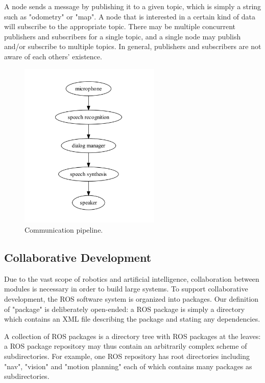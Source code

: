 A node sends a message by publishing it to a given topic, which is simply a string such as "odometry" or "map". A node that is interested in a certain kind of data will subscribe to the appropriate topic. There may be multiple concurrent publishers and subscribers for a single topic, and a single node may publish and/or subscribe to multiple topics. In general, publishers and subscribers are not aware of each others' existence.

\begin{figure}[h]
\centering
\includegraphics[width=0.6\textwidth]{figs/ch2/ros-pipeline}
\caption{Communication pipeline.}
\end{figure}

\subsection{Collaborative Development}

Due to the vast scope of robotics and artificial intelligence, collaboration between modules is necessary in order to build large systems. To support collaborative development, the ROS software system is organized into packages. Our definition of "package" is deliberately open-ended: a ROS package is simply a directory which contains an XML file describing the package and stating any dependencies.

A collection of ROS packages is a directory tree with ROS packages at the leaves: a ROS package repository may thus contain an arbitrarily complex scheme of subdirectories. For example, one ROS repository has root directories including "nav", "vision" and "motion planning" each of which contains many packages as subdirectories.

